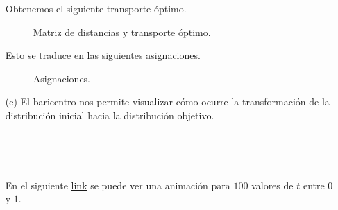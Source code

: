 \documentclass[
	spanish, %
	letterpaper, oneside
]{article}
\begin{document}
\begin{enumerate}
	Obtenemos el siguiente transporte óptimo.
	
	\begin{figure}[H]
		\caption{Matriz de distancias y transporte óptimo.}
	\end{figure}
	
	Esto se traduce en las siguientes asignaciones.
	
	\begin{figure}[H]
		\caption{Asignaciones.}
	\end{figure}
	
	\item[(e)] El baricentro nos permite visualizar cómo ocurre la transformación de la distribución inicial hacia la distribución objetivo.
	
	\begin{multicols}{2}
	\begin{figure}[H]
		\\
	\end{figure}
	\begin{figure}[H]
		\\
	\end{figure}
	\end{multicols}

En el siguiente \href{https://github.com/DanielMinaya1/MDS7203/blob/main/Laboratorio_1/barycenter.gif}{link} se puede ver una animación para \(100\) valores de \(t\) entre \(0\) y \(1\).
\end{enumerate}
\end{document}
